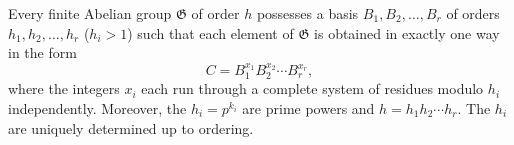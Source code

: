 Every finite Abelian group $\mathfrak{G}$ of order $h$ possesses a basis $B_1, B_2, \ldots, B_r$ of orders $h_1, h_2, \ldots, h_r$ ($h_i > 1$) such that each element of $\mathfrak{G}$ is obtained in exactly one way in the form
$$C = B_1^{x_1} B_2^{x_2} \cdots B_r^{x_r},$$
where the integers $x_i$ each run through a complete system of residues modulo $h_i$ independently. Moreover, the $h_i = p^{k_i}$ are prime powers and $h = h_1 h_2 \cdots h_r$. The $h_i$ are uniquely determined up to ordering.
